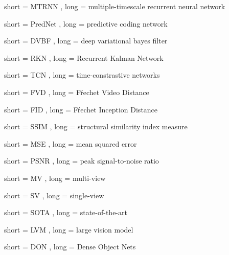 


{
	short = MTRNN ,
	long = multiple-timescale recurrent neural network
}




{
	short = PredNet ,
	long = predictive coding network
}

{
	short = DVBF ,
	long = deep variational bayes filter
}

{
	short = RKN ,
	long = Recurrent Kalman Network
}

{
	short = TCN ,
	long = time-constrastive networks
}





{
	short = FVD ,
	long = Fŕechet Video Distance
}

{
	short = FID ,
	long = Fŕechet Inception Distance
}

{
	short = SSIM ,
	long = structural similarity index measure
}

{
	short = MSE ,
	long = mean squared error
}

{
	short = PSNR ,
	long = peak signal-to-noise ratio
}

{
	short = MV ,
	long = multi-view
}

{
	short = SV ,
	long = single-view
}

{
	short = SOTA ,
	long = state-of-the-art
}

{
	short = LVM ,
	long = large vision model
}

{
	short = DON ,
	long = Dense Object Nets
}

